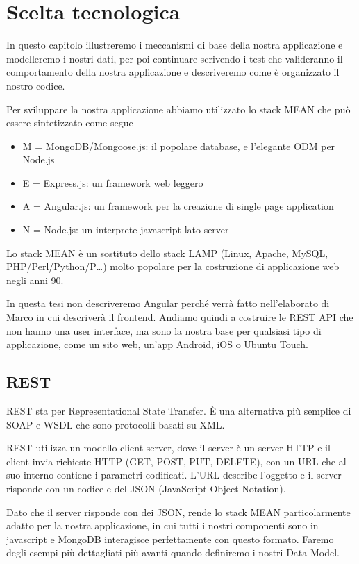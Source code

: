 \chapter{Scelta tecnologica}
\label{chap:scelta}
\nocite{rest}

In questo capitolo illustreremo i meccanismi di base della nostra applicazione e modelleremo i nostri dati, per poi continuare scrivendo i test che valideranno il comportamento della nostra applicazione e descriveremo come è organizzato il nostro codice.


Per sviluppare la nostra applicazione abbiamo utilizzato lo stack MEAN che può essere sintetizzato come segue
\begin{itemize}
\item M = MongoDB/Mongoose.js: il popolare database, e l'elegante ODM per Node.js
\item E = Express.js: un framework web leggero
\item A = Angular.js: un framework per la creazione di single page application
\item N = Node.js: un interprete javascript lato server
\end{itemize}
Lo stack MEAN è un sostituto dello stack LAMP (Linux, Apache, MySQL, PHP/Perl/Python/P…) molto popolare per la costruzione di applicazione web negli anni 90.

In questa tesi non descriveremo Angular perché verrà fatto nell'elaborato di Marco in cui descriverà il frontend. 
Andiamo quindi a costruire le REST API che non hanno una user interface, ma sono la nostra base per qualsiasi tipo di applicazione, come un sito web, un'app Android, iOS o Ubuntu Touch.

\section{REST}
REST sta per Representational State Transfer\cite{rest}. È una alternativa più semplice di SOAP e WSDL che sono protocolli basati su XML.

REST utilizza un modello client-server, dove il server è un server HTTP e il client invia richieste HTTP (GET, POST, PUT, DELETE), con un URL che al suo interno contiene i parametri codificati. L'URL describe l'oggetto e il server risponde con un codice e del JSON (JavaScript Object Notation).

Dato che il server risponde con dei JSON, rende lo stack MEAN particolarmente adatto per la nostra applicazione, in cui tutti i nostri componenti sono in javascript e MongoDB interagisce perfettamente con questo formato. 
Faremo degli esempi più dettagliati più avanti quando definiremo i nostri Data Model.

